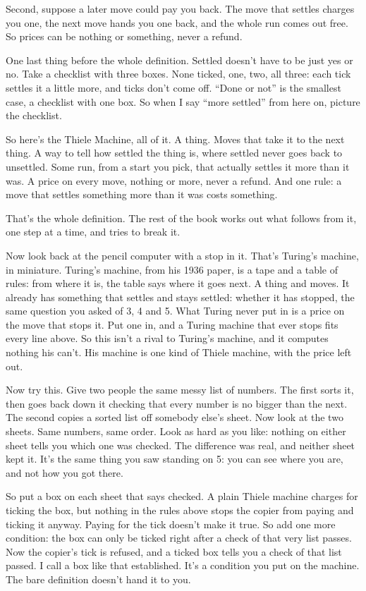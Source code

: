 \documentclass[11pt,twoside]{article}
\theoremstyle{thielethm}
\theoremstyle{thieledef}
\theoremstyle{thieledef}
\theoremstyle{thieledef}
\theoremstyle{thielethm}
\theoremstyle{thieleobs}
\theoremstyle{thielethm}
\begin{document}
Second, suppose a later move could pay you back. The move that settles charges you one, the next move hands you one back, and the whole run comes out free. So prices can be nothing or something, never a refund.

One last thing before the whole definition. Settled doesn't have to be just yes or no. Take a checklist with three boxes. None ticked, one, two, all three: each tick settles it a little more, and ticks don't come off. ``Done or not'' is the smallest case, a checklist with one box. So when I say ``more settled'' from here on, picture the checklist.

So here's the Thiele Machine, all of it. A thing. Moves that take it to the next thing. A way to tell how settled the thing is, where settled never goes back to unsettled. Some run, from a start you pick, that actually settles it more than it was. A price on every move, nothing or more, never a refund. And one rule: a move that settles something more than it was costs something.

That's the whole definition. The rest of the book works out what follows from it, one step at a time, and tries to break it.

Now look back at the pencil computer with a stop in it. That's Turing's machine, in miniature. Turing's machine, from his 1936 paper, is a tape and a table of rules: from where it is, the table says where it goes next. A thing and moves. It already has something that settles and stays settled: whether it has stopped, the same question you asked of 3, 4 and 5. What Turing never put in is a price on the move that stops it. Put one in, and a Turing machine that ever stops fits every line above. So this isn't a rival to Turing's machine, and it computes nothing his can't. His machine is one kind of Thiele machine, with the price left out.

Now try this. Give two people the same messy list of numbers. The first sorts it, then goes back down it checking that every number is no bigger than the next. The second copies a sorted list off somebody else's sheet. Now look at the two sheets. Same numbers, same order. Look as hard as you like: nothing on either sheet tells you which one was checked. The difference was real, and neither sheet kept it. It's the same thing you saw standing on 5: you can see where you are, and not how you got there.

So put a box on each sheet that says checked. A plain Thiele machine charges for ticking the box, but nothing in the rules above stops the copier from paying and ticking it anyway. Paying for the tick doesn't make it true. So add one more condition: the box can only be ticked right after a check of that very list passes. Now the copier's tick is refused, and a ticked box tells you a check of that list passed. I call a box like that established. It's a condition you put on the machine. The bare definition doesn't hand it to you.
\end{document}
